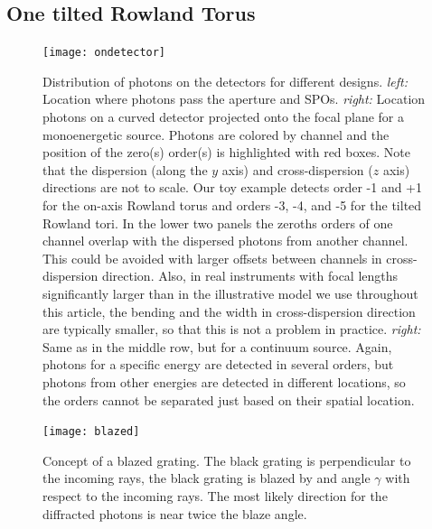 \documentclass[twocolumn]{aastex631}
\begin{document}
\subsection{One tilted Rowland Torus}


\begin{figure}
    \centering
    \texttt{[image: ondetector]}
    \caption{Distribution of photons on the detectors for different designs. \emph{left:} Location where photons pass the aperture and SPOs. \emph{right:} Location photons on a curved detector projected onto the focal plane for a monoenergetic source. Photons are colored by channel and the position of the zero(s) order(s) is highlighted with red boxes. Note that the dispersion (along the $y$ axis) and cross-dispersion ($z$ axis) directions are not to scale. Our toy example detects order -1 and +1 for the on-axis Rowland torus and orders -3, -4, and -5 for the tilted Rowland tori. In the lower two panels the zeroths orders of one channel overlap with the dispersed photons from another channel. This could be avoided with larger offsets between channels in cross-dispersion direction. Also, in real instruments with focal lengths significantly larger than in the illustrative model we use throughout this article, the bending and the width in cross-dispersion direction are typically smaller, so that this is not a problem in practice.
    \emph{right:} Same as in the middle row, but for a continuum source. Again, photons for a specific energy are detected in several orders, but photons from other energies are detected in different locations, so the orders cannot be separated just based on their spatial location.
        }
    \label{fig:fish}
\end{figure}

\begin{figure}
    \centering
    \texttt{[image: blazed]}
    \caption{Concept of a blazed grating. The black grating is perpendicular to the incoming rays, the black grating is blazed by and angle $\gamma$ with respect to the incoming rays. The most likely direction for the diffracted photons is near twice the blaze angle.}
    \label{fig:blazed}
\end{figure}
\end{document}
